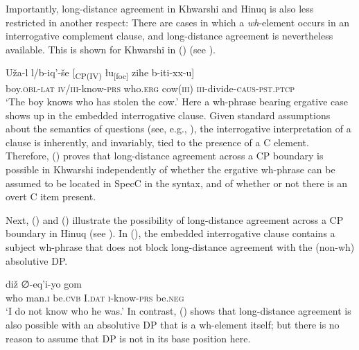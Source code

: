 \documentclass[output=paper
,modfonts
,nonflat]{langsci/langscibook}
\begin{document}
	Importantly, long-distance agreement in Khwarshi and Hinuq is also less
	restricted in another respect:
	There are cases in which a {\em wh}-element occurs in
	an interrogative  complement clause, and long-distance agreement is nevertheless
	available. This is shown for Khwarshi in (\Next) (see \citealt{Khalilova09}). 
	
	\ea\label{ex:mueller:18}
	\gll U\v{z}a-l l/b-iq'-\v{s}e [\textsubscript{CP(IV)} \l \label{cp1}u\textsubscript{[foc]} zihe b-iti-xx-u] \\
	boy.{\scshape obl-lat} {\scshape iv/iii}-know-{\scshape prs} {} who.{\scshape erg} cow({\scshape iii}) {\scshape iii}-divide-{\scshape caus-pst.ptcp} \\
	\glt `The boy knows who has stolen the cow.'
	\z
	Here a wh-phrase bearing ergative case shows up in the embedded
	interrogative clause. Given standard assumptions about the
	semantics of questions (see, e.g., \citealt{Stechow:96:aga}),
	the interrogative interpretation of a clause is inherently, and
	invariably, tied to the presence of a C element. Therefore, (\Last)
	proves that long-distance agreement across a CP boundary is possible
	in Khwarshi independently of whether the ergative wh-phrase can be
	assumed to be located in SpecC in the syntax, and of whether or not
	there is an overt C item present. 
	
	Next, (\Next) and (\NNext) illustrate the possibility of long-distance
	agreement across a CP boundary in Hinuq (see \citealt{Forker:11}). In
	(\Next), the embedded interrogative clause contains a subject
	wh-phrase that does not block long-distance agreement with the
	(non-wh) absolutive DP. 
	
	\ea\label{ex:mueller:19} 
	\gll{} di\v{z} ∅-eq'i-yo gom \\
	{} who man.{\scshape i} be.{\scshape cvb} I.{\scshape dat} {\scshape i}-know-{\scshape prs}  be.{\scshape neg} \\ 
	\glt `I do not know who he was.'
	\z
	In contrast, (\Next) shows that long-distance agreement is also possible with
	an absolutive DP that is a wh-element itself; but there is no reason
	to assume that DP is not in its base position here. 
	
\end{document}
